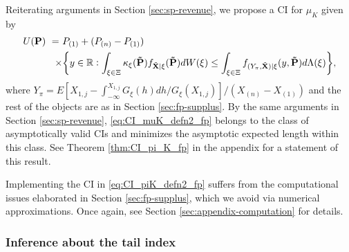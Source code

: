 Reiterating arguments in Section \ref{sec:sp-revenue}, we propose a CI for $\mu _{K}$ given by
\begin{align}
U(\mathbf{P})~=~& P_{(1)} + ( P_{(n)}-P_{(1)}) \notag \\ 
\times& \bigg\{ y \in \mathbb{R} : \int_{\xi \in \Xi} \kappa_{\xi}(\mathbf{\tilde{P}}) f_{\tilde{\mathbf{X}}|\xi}(\mathbf{\tilde{P}}) dW(\xi) \leq \int_{\xi \in \Xi} f_{(Y_{\pi},\tilde{\mathbf{X}})|\xi}(y,\mathbf{\tilde{P}}) d\Lambda(\xi) \bigg\} , \label{eq:CI_piK_defn2_fp}
\end{align}
where $Y_{\pi }=E[ X_{1,j} -{\int_{-\infty }^{X_{1,j} }G_{\xi }( h) dh}/{G_{\xi }( X_{1,j} ) }]/( X_{( n) }-X_{( 1) }) $ and the rest of the objects are as in Section \ref{sec:fp-supplus}.
By the same arguments in Section \ref{sec:sp-revenue}, \eqref{eq:CI_muK_defn2_fp} belongs to the class of asymptotically valid CIs and minimizes the asymptotic expected length within this class. See Theorem \ref{thm:CI_pi_K_fp} in the appendix for a statement of this result.

Implementing the CI in \eqref{eq:CI_piK_defn2_fp} suffers from the computational issues elaborated in Section \ref{sec:fp-supplus}, which we avoid via numerical approximations. Once again, see Section \ref{sec:appendix-computation} for details.

\subsubsection{Inference about the tail index}\label{sec:HypApplication-fp}

